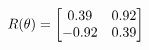 \documentclass[preview]{standalone}
\begin{document}
\begin{align*}
\special{dvisvgm:raw <g id='unique000'>}R(\theta) = \begin{bmatrix}0.39 & 0.92\\-0.92 & 0.39\end{bmatrix}\special{dvisvgm:raw </g>}
\end{align*}
\end{document}
